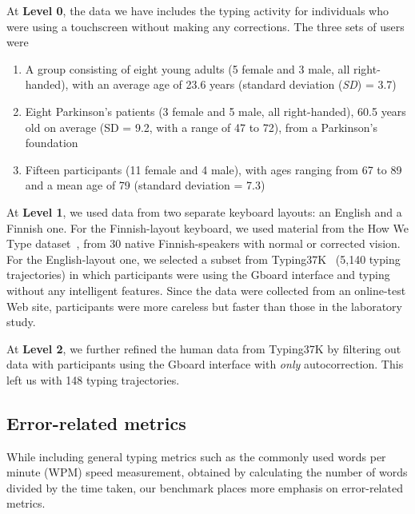 
At \textbf{Level 0}, the data we have includes the typing activity for individuals who were using a touchscreen without making any corrections. The three sets of users were 
\begin{enumerate}
    \item A group consisting of eight young adults (5 female and 3 male, all right-handed), with an average age of 23.6 years (standard deviation (\emph{SD}) = 3.7)~\cite{wang2021facilitating} 
    \item Eight Parkinson's patients (3 female and 5 male, all right-handed), 60.5 years old on average ({SD} = 9.2, with a range of 47 to 72), from a Parkinson's foundation~\cite{wang2021facilitating}
    \item Fifteen participants (11 female and 4 male), with ages ranging from 67 to 89 and a mean age of 79 (standard deviation = 7.3)~\cite{nicolau2012elderly}
\end{enumerate}

At \textbf{Level 1}, we used data from two separate keyboard layouts: an English and a Finnish one. 
For the Finnish-layout keyboard, we used material from the How We Type dataset~\cite{jiang2020we}, from 30 native Finnish-speakers with normal or corrected vision.
For the English-layout one, we selected a subset from Typing37K~\cite{palin2019people} (5,140 typing trajectories) in which participants were using the Gboard interface and typing without any intelligent features. Since the data were collected from an online-test Web site, participants were more careless but faster than those in the laboratory study.

At \textbf{Level 2}, we further refined the human data from Typing37K by filtering out data with participants using the Gboard interface with \emph{only} autocorrection. This left us with 148 typing trajectories.

\subsection{Error-related metrics}
\label{sec:metrics}

While including general typing metrics such as the commonly used words per minute (WPM) speed measurement, obtained by calculating the number of words divided by the time taken, our benchmark places more emphasis on error-related metrics.

